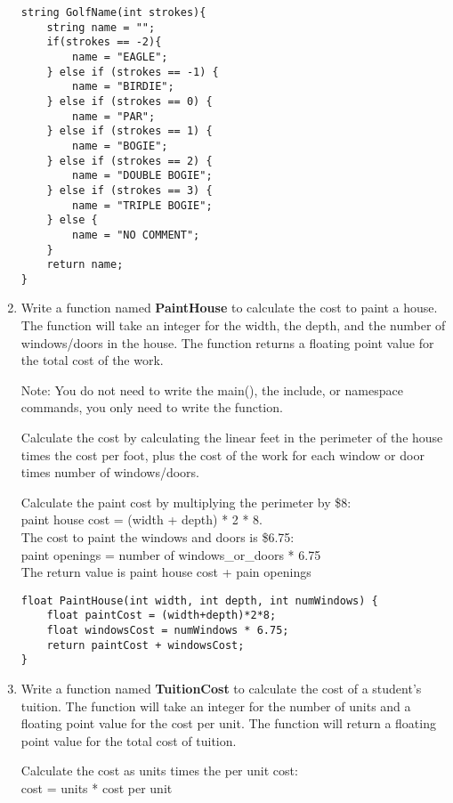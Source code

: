 \documentclass{article}
\begin{document}
\begin{enumerate}
\begin{lstlisting}
string GolfName(int strokes){
    string name = "";
    if(strokes == -2){
        name = "EAGLE";
    } else if (strokes == -1) {
        name = "BIRDIE";
    } else if (strokes == 0) {
        name = "PAR";
    } else if (strokes == 1) {
        name = "BOGIE";
    } else if (strokes == 2) {
        name = "DOUBLE BOGIE";
    } else if (strokes == 3) {
        name = "TRIPLE BOGIE";
    } else {
        name = "NO COMMENT";
    }
    return name;
}
\end{lstlisting}


	\item Write a function named \textbf{PaintHouse} to calculate the cost to paint a house.  The function will take an integer for the width, the depth, and the number of windows/doors in the house. The function returns a floating point value for the total cost of the work.

Note: You do not need to write the main(), the include, or namespace commands, you only need to write the function.

Calculate the cost by calculating the linear feet in the perimeter of the house times the cost per foot, plus the cost of the work for each window or door times number of windows/doors.

Calculate the paint cost by multiplying the perimeter by \$8:\\
\quad    paint house cost  = (width + depth) * 2 * 8.\\
The cost to paint the windows and doors is \$6.75:\\
\quad    paint openings = number of windows\_or\_doors * 6.75\\
The return value is paint house cost + pain openings

\begin{lstlisting}
float PaintHouse(int width, int depth, int numWindows) {
    float paintCost = (width+depth)*2*8;
    float windowsCost = numWindows * 6.75;
    return paintCost + windowsCost;
}
\end{lstlisting}


	\item Write a function named \textbf{TuitionCost} to calculate the cost of a student's tuition. The function will take an integer for the number of units and a floating point value for the cost per unit. The function will return a floating point value for the total cost of tuition. 

Calculate the cost as units times the per unit cost: \\
                 cost = units * cost per unit 


\end{enumerate}
\end{document}
